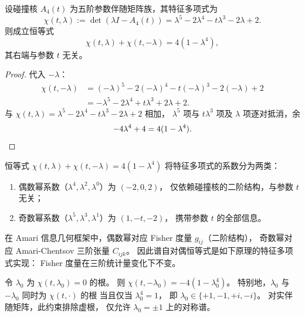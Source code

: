 \begin{theorem}\label{thm:killo-fold-collision-spectral-self-duality}
设碰撞核 \(A_4(t)\) 为五阶参数伴随矩阵族，其特征多项式为
\[
\chi(t,\lambda):=\det(\lambda I-A_4(t))
=\lambda^5-2\lambda^4-t\lambda^3-2\lambda+2.
\]
则成立恒等式
\[
\boxed{\;
\chi(t,\lambda)+\chi(t,-\lambda)=4(1-\lambda^4),
\;}
\]
其右端与参数 \(t\) 无关。
\end{theorem}

\begin{proof}
代入 \(-\lambda\)：
\begin{align*}
\chi(t,-\lambda)
&=(-\lambda)^5-2(-\lambda)^4-t(-\lambda)^3-2(-\lambda)+2\\
&=-\lambda^5-2\lambda^4+t\lambda^3+2\lambda+2.
\end{align*}
与 \(\chi(t,\lambda)=\lambda^5-2\lambda^4-t\lambda^3-2\lambda+2\) 相加，
\(\lambda^5\) 项与 \(t\lambda^3\) 项及 \(\lambda\) 项逐对抵消，余
\[
-4\lambda^4+4=4(1-\lambda^4).\qedhere
\]
\end{proof}

\begin{corollary}[度量-张量分离]\label{cor:killo-fold-collision-metric-tensor-separation}
恒等式 \(\chi(t,\lambda)+\chi(t,-\lambda)=4(1-\lambda^4)\)
将特征多项式的系数分为两类：
\begin{enumerate}
\item 偶数幂系数（\(\lambda^4,\lambda^2,\lambda^0\)）为 \((-2,0,2)\)，
      仅依赖碰撞核的二阶结构，与参数 \(t\) 无关；
\item 奇数幂系数（\(\lambda^5,\lambda^3,\lambda^1\)）为 \((1,-t,-2)\)，
      携带参数 \(t\) 的全部信息。
\end{enumerate}
在 Amari 信息几何框架中，偶数幂对应 Fisher 度量 \(g_{ij}\)（二阶结构），
奇数幂对应 Amari-Chentsov 三阶张量 \(C_{ijk}\)。
因此谱自对偶恒等式是如下原理的特征多项式实现：
Fisher 度量在三阶统计量变化下不变。
\end{corollary}

\begin{corollary}\label{cor:killo-fold-collision-self-dual-zeros}
令 \(\lambda_0\) 为 \(\chi(t,\lambda_0)=0\) 的根。
则 \(\chi(t,-\lambda_0)=-4(1-\lambda_0^4)\)。
特别地，\(\lambda_0\) 与 \(-\lambda_0\) 同时为 \(\chi(t,\cdot)\) 的根
当且仅当 \(\lambda_0^4=1\)，
即 \(\lambda_0\in\{+1,-1,+i,-i\}\)。
对实伴随矩阵，此约束排除虚根，
仅允许 \(\lambda_0=\pm 1\) 上的对称谱。
\end{corollary}
